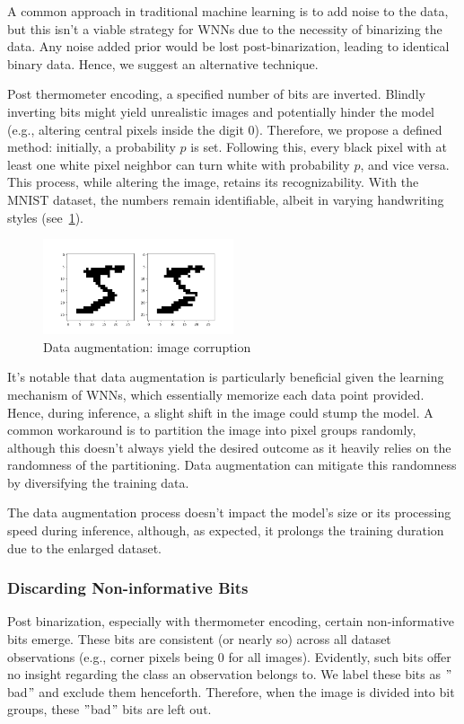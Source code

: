 \documentclass{article}[12pt]
\begin{document}
A common approach in traditional machine learning is to add noise to the data, but this isn't a viable strategy for WNNs due to the necessity of binarizing the data.
Any noise added prior would be lost post-binarization, leading to identical binary data.
Hence, we suggest an alternative technique.

Post thermometer encoding, a specified number of bits are inverted.
Blindly inverting bits might yield unrealistic images and potentially hinder the model (e.g., altering central pixels inside the digit 0).
Therefore, we propose a defined method: initially, a probability \(p\) is set.
Following this, every black pixel with at least one white pixel neighbor can turn white with probability \(p\), and vice versa.
This process, while altering the image, retains its recognizability.
With the MNIST dataset, the numbers remain identifiable, albeit in varying handwriting styles (see~\ref{fig:fig-2}).

\begin{figure}[h]
    \centering
    \includegraphics[width=0.5\textwidth]{imgs/img_corruption}
    \caption{Data augmentation: image corruption}
    \label{fig:fig-2}
\end{figure}

It's notable that data augmentation is particularly beneficial given the learning mechanism of WNNs, which essentially memorize each data point provided.
Hence, during inference, a slight shift in the image could stump the model.
A common workaround is to partition the image into pixel groups randomly, although this doesn't always yield the desired outcome as it heavily relies on the randomness of the partitioning.
Data augmentation can mitigate this randomness by diversifying the training data.

The data augmentation process doesn't impact the model's size or its processing speed during inference, although, as expected, it prolongs the training duration due to the enlarged dataset.

\subsubsection*{Discarding Non-informative Bits}
Post binarization, especially with thermometer encoding, certain non-informative bits emerge.
These bits are consistent (or nearly so) across all dataset observations (e.g., corner pixels being 0 for all images).
Evidently, such bits offer no insight regarding the class an observation belongs to.
We label these bits as \("\)bad\("\) and exclude them henceforth.
Therefore, when the image is divided into bit groups, these \("\)bad\("\) bits are left out.
\end{document}
